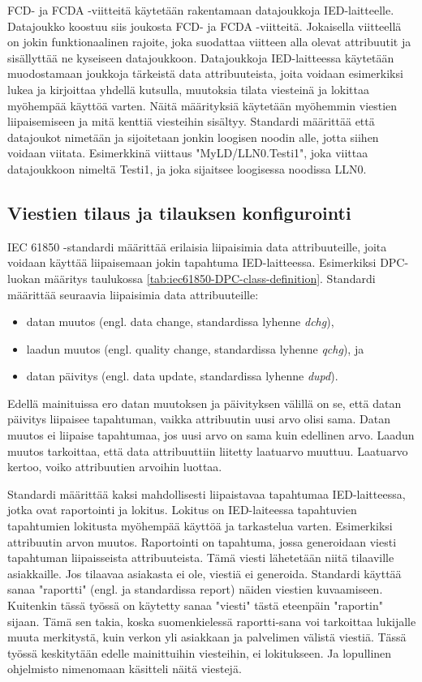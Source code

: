 FCD- ja FCDA -viitteitä käytetään rakentamaan datajoukkoja IED-laitteelle. Datajoukko koostuu siis joukosta FCD- ja FCDA -viitteitä. Jokaisella viitteellä on jokin funktionaalinen rajoite, joka suodattaa viitteen alla olevat attribuutit ja sisällyttää ne kyseiseen datajoukkoon. Datajoukkoja IED-laitteessa käytetään muodostamaan joukkoja tärkeistä data attribuuteista, joita voidaan esimerkiksi lukea ja kirjoittaa yhdellä kutsulla, muutoksia tilata viesteinä ja lokittaa myöhempää käyttöä varten. Näitä määrityksiä käytetään myöhemmin viestien liipaisemiseen ja mitä kenttiä viesteihin sisältyy. Standardi määrittää että datajoukot nimetään ja sijoitetaan jonkin loogisen noodin alle, jotta siihen voidaan viitata. Esimerkkinä viittaus "MyLD/LLN0.Testi1", joka viittaa datajoukkoon nimeltä Testi1, ja joka sijaitsee loogisessa noodissa LLN0. \cite[s.~61--68]{IEC61850-7-2}


\subsection{Viestien tilaus ja tilauksen konfigurointi}
IEC 61850 -standardi määrittää erilaisia liipaisimia data attribuuteille, joita voidaan käyttää liipaisemaan jokin tapahtuma IED-laitteessa. Esimerkiksi DPC-luokan määritys taulukossa \ref{tab:iec61850-DPC-class-definition}. Standardi määrittää seuraavia liipaisimia data attribuuteille:
\begin{itemize}
	\item datan muutos (engl. data change, standardissa lyhenne \emph{dchg}),
	\item laadun muutos (engl. quality change, standardissa lyhenne \emph{qchg}), ja
	\item datan päivitys (engl. data update, standardissa lyhenne \emph{dupd}).
\end{itemize}
Edellä mainituissa ero datan muutoksen ja päivityksen välillä on se, että datan päivitys liipaisee tapahtuman, vaikka attribuutin uusi arvo olisi sama. Datan muutos ei liipaise tapahtumaa, jos uusi arvo on sama kuin edellinen arvo. Laadun muutos tarkoittaa, että data attribuuttiin liitetty laatuarvo muuttuu. Laatuarvo kertoo, voiko attribuutien arvoihin luottaa. \cite[s.~90]{IEC61850-7-1}

Standardi määrittää kaksi mahdollisesti liipaistavaa tapahtumaa IED-laitteessa, jotka ovat raportointi ja lokitus. Lokitus on IED-laiteessa tapahtuvien tapahtumien lokitusta myöhempää käyttöä ja tarkastelua varten. Esimerkiksi attribuutin arvon muutos. Raportointi on tapahtuma, jossa generoidaan viesti tapahtuman liipaisseista attribuuteista. Tämä viesti lähetetään niitä tilaaville asiakkaille. Jos tilaavaa asiakasta ei ole, viestiä ei generoida. Standardi käyttää sanaa "raportti" (engl. ja standardissa report) näiden viestien kuvaamiseen. Kuitenkin tässä työssä on käytetty sanaa "viesti" tästä eteenpäin "raportin" sijaan. Tämä sen takia, koska suomenkielessä raportti-sana voi tarkoittaa lukijalle muuta merkitystä, kuin verkon yli asiakkaan ja palvelimen välistä viestiä. Tässä työssä keskitytään edelle mainittuihin viesteihin, ei lokitukseen. Ja lopullinen ohjelmisto nimenomaan käsitteli näitä viestejä.

